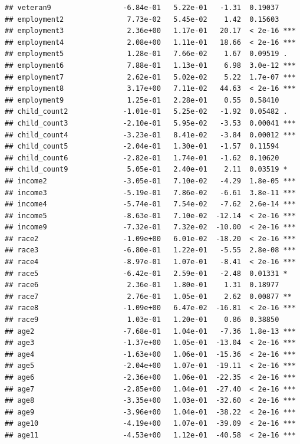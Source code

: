 \documentclass[
]{article}
\begin{document}
\begin{verbatim}
## veteran9                 -6.84e-01   5.22e-01   -1.31  0.19037    
## employment2               7.73e-02   5.45e-02    1.42  0.15603    
## employment3               2.36e+00   1.17e-01   20.17  < 2e-16 ***
## employment4               2.08e+00   1.11e-01   18.66  < 2e-16 ***
## employment5               1.28e-01   7.66e-02    1.67  0.09519 .  
## employment6               7.88e-01   1.13e-01    6.98  3.0e-12 ***
## employment7               2.62e-01   5.02e-02    5.22  1.7e-07 ***
## employment8               3.17e+00   7.11e-02   44.63  < 2e-16 ***
## employment9               1.25e-01   2.28e-01    0.55  0.58410    
## child_count2             -1.01e-01   5.25e-02   -1.92  0.05482 .  
## child_count3             -2.10e-01   5.95e-02   -3.53  0.00041 ***
## child_count4             -3.23e-01   8.41e-02   -3.84  0.00012 ***
## child_count5             -2.04e-01   1.30e-01   -1.57  0.11594    
## child_count6             -2.82e-01   1.74e-01   -1.62  0.10620    
## child_count9              5.05e-01   2.40e-01    2.11  0.03519 *  
## income2                  -3.05e-01   7.10e-02   -4.29  1.8e-05 ***
## income3                  -5.19e-01   7.86e-02   -6.61  3.8e-11 ***
## income4                  -5.74e-01   7.54e-02   -7.62  2.6e-14 ***
## income5                  -8.63e-01   7.10e-02  -12.14  < 2e-16 ***
## income9                  -7.32e-01   7.32e-02  -10.00  < 2e-16 ***
## race2                    -1.09e+00   6.01e-02  -18.20  < 2e-16 ***
## race3                    -6.80e-01   1.22e-01   -5.55  2.8e-08 ***
## race4                    -8.97e-01   1.07e-01   -8.41  < 2e-16 ***
## race5                    -6.42e-01   2.59e-01   -2.48  0.01331 *  
## race6                     2.36e-01   1.80e-01    1.31  0.18977    
## race7                     2.76e-01   1.05e-01    2.62  0.00877 ** 
## race8                    -1.09e+00   6.47e-02  -16.81  < 2e-16 ***
## race9                     1.03e-01   1.20e-01    0.86  0.38850    
## age2                     -7.68e-01   1.04e-01   -7.36  1.8e-13 ***
## age3                     -1.37e+00   1.05e-01  -13.04  < 2e-16 ***
## age4                     -1.63e+00   1.06e-01  -15.36  < 2e-16 ***
## age5                     -2.04e+00   1.07e-01  -19.11  < 2e-16 ***
## age6                     -2.36e+00   1.06e-01  -22.35  < 2e-16 ***
## age7                     -2.85e+00   1.04e-01  -27.40  < 2e-16 ***
## age8                     -3.35e+00   1.03e-01  -32.60  < 2e-16 ***
## age9                     -3.96e+00   1.04e-01  -38.22  < 2e-16 ***
## age10                    -4.19e+00   1.07e-01  -39.09  < 2e-16 ***
## age11                    -4.53e+00   1.12e-01  -40.58  < 2e-16 ***

\end{verbatim}
\end{document}
